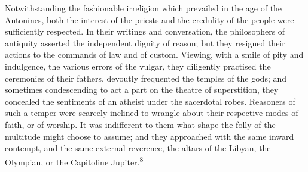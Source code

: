 
Notwithstanding the fashionable irreligion which prevailed in the
age of the Antonines, both the interest of the priests and the
credulity of the people were sufficiently respected. In their
writings and conversation, the philosophers of antiquity asserted
the independent dignity of reason; but they resigned their
actions to the commands of law and of custom. Viewing, with a
smile of pity and indulgence, the various errors of the vulgar,
they diligently practised the ceremonies of their fathers,
devoutly frequented the temples of the gods; and sometimes
condescending to act a part on the theatre of superstition, they
concealed the sentiments of an atheist under the sacerdotal
robes. Reasoners of such a temper were scarcely inclined to
wrangle about their respective modes of faith, or of worship. It
was indifferent to them what shape the folly of the multitude
might choose to assume; and they approached with the same inward
contempt, and the same external reverence, the altars of the
Libyan, the Olympian, or the Capitoline Jupiter.\textsuperscript{8}



